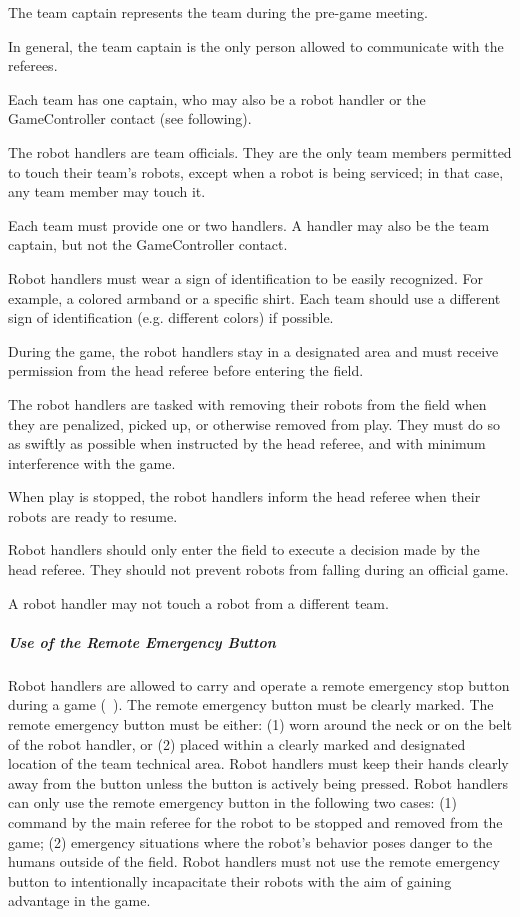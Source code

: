 The team captain represents the team during the pre-game meeting.

In general, the team captain is the only person allowed to communicate with the referees.

Each team has one captain, who may also be a robot handler or the GameController contact (see following).

\label{sec:robot_handlers}

The robot handlers are team officials. They are the only team members permitted to touch their team’s robots, except when a robot is being serviced; in that case, any team member may touch it.

Each team must provide one or two handlers. A handler may also be the team captain, but not the GameController contact.

Robot handlers must wear a sign of identification to be easily recognized. For example, a colored armband or a specific shirt. Each team should use a different sign of identification (e.g. different colors) if possible.

During the game, the robot handlers stay in a designated area and must receive permission from the head referee before entering the field.

The robot handlers are tasked with removing their robots from the field when they are penalized, picked up, or otherwise removed from play. They must do so as swiftly as possible when instructed by the head referee, and with minimum interference with the game.

When play is stopped, the robot handlers inform the head referee when their robots are ready to resume.

Robot handlers should only enter the field to execute a decision made by the head referee. They should not prevent robots from falling during an official game.

A robot handler may not touch a robot from a different team.

\subparagraph{Use of the Remote Emergency Button}
Robot handlers are allowed to carry and operate a remote emergency stop button during a game (\cf~).
The remote emergency button must be clearly marked.
The remote emergency button must be either: (1) worn around the neck or on the belt of the robot handler, or (2) placed within a clearly marked and designated location of the team technical area. 
Robot handlers must keep their hands clearly away from the button unless the button is actively being pressed. 
%
Robot handlers can only use the remote emergency button in the following two cases: 
(1) command by the main referee for the robot to be stopped and removed from the game;
(2) emergency situations where the robot's behavior poses danger to the humans outside of the field.
%
Robot handlers must not use the remote emergency button to intentionally incapacitate their robots with the aim of gaining advantage in the game.

